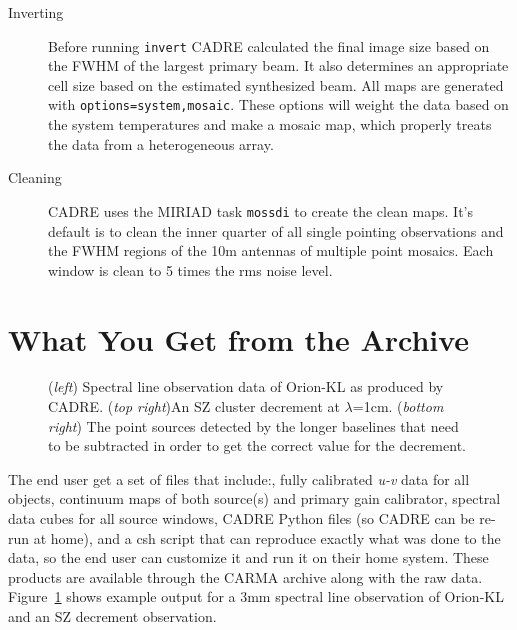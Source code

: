 \begin{description}
\begin{description}
\item[Inverting] Before running \verb#invert# CADRE calculated the final image size based on the FWHM of the largest primary beam. It also determines an appropriate cell size based on the estimated synthesized beam. All maps are generated with \verb#options=system,mosaic#. These options will weight the data based on the system temperatures and make a mosaic map, which properly treats the data from a heterogeneous array.
\item[Cleaning] CADRE uses the MIRIAD task \verb#mossdi# to create the clean maps. It's default is to clean the inner quarter of all single pointing observations and the FWHM regions of the 10m antennas of multiple point mosaics. Each window is clean to 5 times the rms noise level.
\end{description}
\end{description}

\section{What You Get from the Archive}
\begin{figure}[!ht]
\end{figure}
\begin{figure}[!ht]
\caption{(\textit{left}) Spectral line observation data of Orion-KL as produced by CADRE. (\textit{top right})An SZ cluster decrement at $\lambda$=1cm. (\textit{bottom right}) The point sources detected by the longer baselines that need to be subtracted in order to get the correct value for the decrement.\label{fig:SZD}}
\end{figure}
\begin{figure}[!ht]
\end{figure}
The end user get a set of files that include:, fully calibrated \textit{u-v} data for all objects, continuum maps of both source(s) and primary gain calibrator, spectral data cubes for all source windows,  CADRE Python files (so CADRE can be re-run at home), and a csh script that can reproduce exactly what was done to the data, so the end user can customize it and run it on their home system. These products are available through the CARMA archive along with the raw data. Figure~\ref{fig:SZD} shows example output for a 3mm spectral line observation of Orion-KL and an SZ decrement observation.

